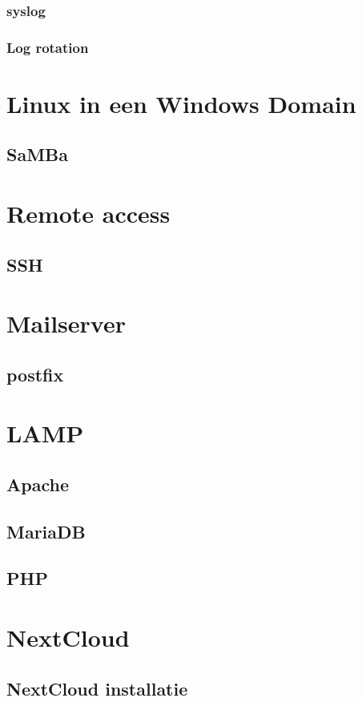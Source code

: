 \documentclass[a4paper,12pt,twoside,openright,titlepage]{book}
\begin{document}
\subsection{syslog}
\subsection{Log rotation}

\chapter{Linux in een Windows Domain}
\section{SaMBa}

\chapter{Remote access}
\section{SSH}

\chapter{Mailserver}
\section{postfix}

\chapter{LAMP}

\section{Apache}


\section{MariaDB}

\section{PHP}


\chapter{NextCloud}

\section{NextCloud installatie}



\printindex
\end{document}
